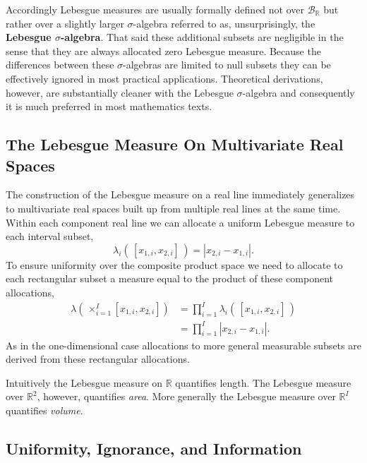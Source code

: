 \documentclass[
  letterpaper,
  DIV=11,
  numbers=noendperiod]{scrartcl}
\begin{document}
Accordingly Lebesgue measures are usually formally defined not over
\(\mathcal{B}_{\mathbb{R}}\) but rather over a slightly larger
\(\sigma\)-algebra referred to as, unsurprisingly, the \textbf{Lebesgue
\(\sigma\)-algebra}. That said these additional subsets are negligible
in the sense that they are always allocated zero Lebesgue measure.
Because the differences between these \(\sigma\)-algebras are limited to
null subsets they can be effectively ignored in most practical
applications. Theoretical derivations, however, are substantially
cleaner with the Lebesgue \(\sigma\)-algebra and consequently it is much
preferred in most mathematics texts.

\hypertarget{the-lebesgue-measure-on-multivariate-real-spaces}{%
\subsection{The Lebesgue Measure On Multivariate Real
Spaces}\label{the-lebesgue-measure-on-multivariate-real-spaces}}

The construction of the Lebesgue measure on a real line immediately
generalizes to multivariate real spaces built up from multiple real
lines at the same time. Within each component real line we can allocate
a uniform Lebesgue measure to each interval subset, \[
\lambda_{i}( \, [x_{1, i}, x_{2, i}] \, )
= | x_{2, i} - x_{1, i} |.
\] To ensure uniformity over the composite product space we need to
allocate to each rectangular subset a measure equal to the product of
these component allocations, \begin{align*}
\lambda( \, \times_{i = 1}^{I} [ x_{1, i}, x_{2, i} ] )
&=
\prod_{i = 1}^{I} \lambda_{i}( \, [x_{1, i}, x_{2, i}] \, )
\\
&=
\prod_{i = 1}^{I} | x_{2, i} - x_{1, i} |.
\end{align*} As in the one-dimensional case allocations to more general
measurable subsets are derived from these rectangular allocations.

Intuitively the Lebesgue measure on \(\mathbb{R}\) quantifies length.
The Lebesgue measure over \(\mathbb{R}^{2}\), however, quantifies
\emph{area}. More generally the Lebesgue measure over \(\mathbb{R}^{I}\)
quantifies \emph{volume}.

\hypertarget{uniformity-ignorance-and-information}{%
\subsection{Uniformity, Ignorance, and
Information}\label{uniformity-ignorance-and-information}}
\end{document}
